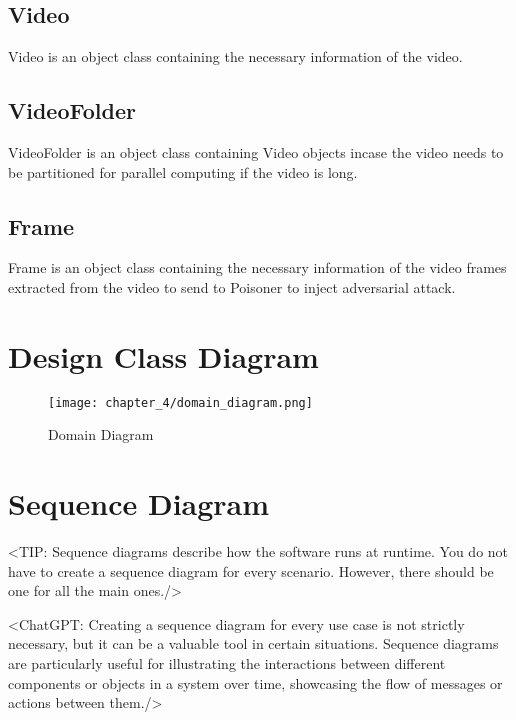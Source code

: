 \subsection{Video}
Video is an object class containing the necessary information of the video.

\subsection{VideoFolder}
VideoFolder is an object class containing Video objects incase the video needs to be partitioned for parallel computing if the video is long.

\subsection{Frame}
Frame is an object class containing the necessary information of the video frames extracted from the video to send to Poisoner to inject adversarial attack.


\section{Design Class Diagram}
\label{section:design-class-diagram}
\begin{figure}[h]
    \centering
    \texttt{[image: chapter\_4/domain\_diagram.png]}
    \caption{Domain Diagram}
\end{figure}

\section{Sequence Diagram}
\label{section:sequence-diagram}
<TIP: Sequence diagrams describe how the software runs at runtime.
You do not have to create a sequence diagram for every scenario. However,
there should be one for all the main ones./>

<ChatGPT: Creating a sequence diagram for every use case is not
strictly necessary, but it can be a valuable tool in certain situations. Sequence
diagrams are particularly useful for illustrating the interactions between different
components or objects in a system over time, showcasing the flow of messages
or actions between them./>